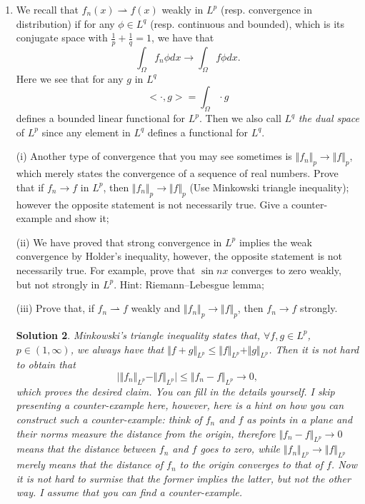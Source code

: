 \documentclass[6pt]{article}
\newtheorem{solution}{Solution}
\numberwithin{equation}{section}
\begin{document}
\begin{enumerate}
\begin{solution}
(ii).  Applying Riemann--Lebesgue lemma gives the desired limit.  I already presented partial approach in class and I assume/need that you know how to prove this lemma in detail.  One student, if you all remember, mentioned that you learnt this in Calculus.  It is possible but I still doubt it as the $L^2$-norm was not introduced by then.  Wish me wrong.
\end{solution}

\item  We recall that $f_n(x) \rightharpoonup f(x)$ weakly in $L^p$ (resp. convergence in distribution) if for any $\phi\in L^q$ (resp. continuous and bounded), which is its conjugate space with $\frac{1}{p}+\frac{1}{q}=1$, we have that
\[\int_\Omega f_n\phi dx\rightarrow \int_\Omega f\phi dx.\]
Here we see that for any $g$ in $L^q$
\[<\cdot, g>=\int_\Omega \cdot g\]
defines a bounded linear functional for $L^p$.  Then we also call $L^q$ \emph{the dual space} of $L^p$ since any element in $L^q$ defines a functional for $L^q$.

(i)  Another type of convergence that you may see sometimes is $\Vert f_n \Vert_p\rightarrow \Vert f\Vert_p$, which merely states the convergence of a sequence of real numbers.  Prove that if $f_n \rightarrow f$ in $L^p$, then $\Vert f_n \Vert_p\rightarrow \Vert f\Vert_p$ (Use Minkowski triangle inequality); however the opposite statement is not necessarily true.  Give a counter-example and show it;

(ii) We have proved that strong convergence in $L^p$ implies the weak convergence by Holder's inequality, however, the opposite statement is not necessarily true.  For example, prove that $\sin nx$ converges to zero weakly, but not strongly in $L^p$.  Hint: Riemann--Lebesgue lemma;

(iii) Prove that, if $f_n \rightharpoonup f$ weakly and $\Vert f_n \Vert_p\rightarrow \Vert f\Vert_p$, then $f_n\rightarrow f$ strongly.

\begin{solution}
Minkowski's triangle inequality states that, $\forall f,g\in L^p$, $p\in(1,\infty)$, we always have that $\Vert f+g\Vert_{L^p}\leq \Vert f\Vert_{L^p}+\Vert g\Vert_{L^p}$.  Then it is not hard to obtain that
\[\big| \Vert f_n\Vert_{L^p}-\Vert f\Vert_{L^p} \big|\leq \Vert f_n-f\Vert_{L^p}\rightarrow 0,\]
which proves the desired claim.  You can fill in the details yourself. I skip presenting a counter-example here, however, here is a hint on how you can construct such a counter-example:  think of $f_n$ and $f$ as points in a plane and their norms measure the distance from the origin, therefore $\Vert f_n-f\Vert_{L^p}\rightarrow 0$ means that the distance between $f_n$ and $f$ goes to zero, while $\Vert f_n\Vert_{L^p}\rightarrow \Vert f\Vert_{L^p}$ merely means that the distance of $f_n$ to the origin converges to that of $f$.  Now it is not hard to surmise that the former implies the latter, but not the other way.  I assume that you can find a counter-example.


\end{solution}
\end{enumerate}
\end{document}

